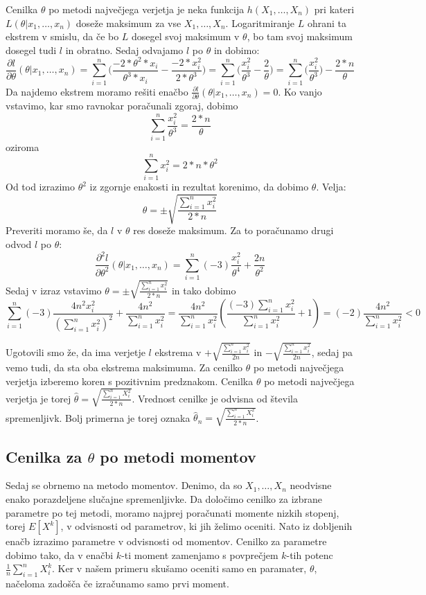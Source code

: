 \documentclass[a4paper, 10pt]{article}
\begin{document}
	Cenilka $\theta$ po metodi največjega verjetja je neka funkcija $h(X_1,\ldots, X_n)$ pri kateri $L(\theta|x_1,\ldots, x_n)$ doseže maksimum za vse $X_1,\ldots, X_n$. Logaritmiranje $L$ ohrani ta ekstrem v smislu, da če bo $L$ dosegel svoj maksimum v $\theta$, bo tam svoj maksimum dosegel tudi $l$ in obratno.
	Sedaj odvajamo $l$ po $\theta$ in dobimo: \begin{equation*}\label{eq: Verjetje}
		\frac{\partial l}{\partial\theta} (\theta | x_1,\ldots, x_n) = \sum_{i = 1}^{n} \big(\frac{-2 * \theta^2 * x_i}{\theta^3 * x_i} - \frac{-2 * x_i^2}{2 * \theta^3}\big) = \sum_{i = 1}^{n} \big(\frac{x_i^2}{\theta^3} - \frac{2}{\theta} \big)= \sum_{i = 1}^{n} \big(\frac{x_i^2}{\theta^3}\big) - \frac{2 * n}{\theta}
	\end{equation*}
	Da najdemo ekstrem moramo rešiti enačbo $\frac{\partial l}{\partial\theta} (\theta | x_1,\ldots, x_n) = 0$. Ko vanjo vstavimo, kar smo ravnokar poračunali zgoraj, dobimo $$
		\sum_{i = 1}^{n}\frac{x_i^2}{\theta^3} = \frac{2*n}{\theta}
	$$
	oziroma $$\sum_{i = 1}^{n}x_i^2 = 2*n*\theta^2$$ Od tod izrazimo $\theta^2$ iz zgornje enakosti in rezultat korenimo, da dobimo $\theta$. Velja: $$\theta = \pm \sqrt{\frac{\sum_{i = 1}^{n}x_i^2}{2 * n}}$$ Preveriti moramo še, da $l$ v $\theta$ res doseže maksimum. Za to poračunamo drugi odvod $l$ po $\theta$: $$\frac{\partial^2 l}{\partial\theta^2}(\theta | x_1, \ldots, x_n) = \sum_{i = 1}^{n} (-3)\frac{x_i^2}{\theta^4} + \frac{2n}{\theta^2}$$ 
	Sedaj v izraz vstavimo $\theta = \pm \sqrt{\frac{\sum_{i = 1}^{n}x_i^2}{2 * n}}$ in tako dobimo $$\sum_{i=1}^{n} (-3)\frac{4 n^2 x_i^2}{(\sum_{i = 1}^{n}x_i^2)^2} + \frac{4n^2}{\sum_{i=1}^{n}x_i^2} = \frac{4n^2}{\sum_{i=1}^{n}x_i^2}(\frac{(-3)\sum_{i=1}^{n}x_i^2}{\sum_{i = 1}^{n}x_i^2} +1) = (-2)\frac{4n^2}{\sum_{i=1}^{n}x_i^2} < 0$$
	
	Ugotovili smo že, da ima verjetje $l$ ekstrema v $+\sqrt{\frac{\sum_{i = 1}^{n}x_i^2}{2n}}$ in $-\sqrt{\frac{\sum_{i = 1}^{n}x_i^2}{2n}}$, sedaj pa vemo tudi, da sta oba ekstrema maksimuma. Za cenilko $\theta$ po metodi največjega verjetja izberemo koren s pozitivnim predznakom. Cenilka $\theta$ po metodi največjega verjetja je torej $\widehat{\theta} = \sqrt{\frac{\sum_{i = 1}^{n}X_i^2}{2 * n}}$. Vrednost cenilke je odvisna od števila spremenljivk. Bolj primerna je torej oznaka $\widehat{\theta}_n = \sqrt{\frac{\sum_{i = 1}^{n}X_i^2}{2 * n}}$.
	
	\subsection{Cenilka za $\theta$ po metodi momentov}\label{subsect: 2B}
	Sedaj se obrnemo na metodo momentov. Denimo, da so $X_1,\ldots, X_n$ neodvisne enako porazdeljene slučajne spremenljivke. Da določimo cenilko za izbrane parametre po tej metodi, moramo najprej poračunati momente nizkih stopenj, torej $E\left[X^k\right]$, v odvisnosti od parametrov, ki jih želimo oceniti. Nato iz dobljenih enačb izrazimo parametre v odvisnosti od momentov. Cenilko za parametre dobimo tako, da v enačbi $k$-ti moment zamenjamo s povprečjem $k$-tih potenc $\frac{1}{n}\sum_{i=1}^{n}X_i^k$. Ker v našem primeru skušamo oceniti samo en paramater, $\theta$, načeloma zadošča če izračunamo samo prvi moment.
	
\end{document}
